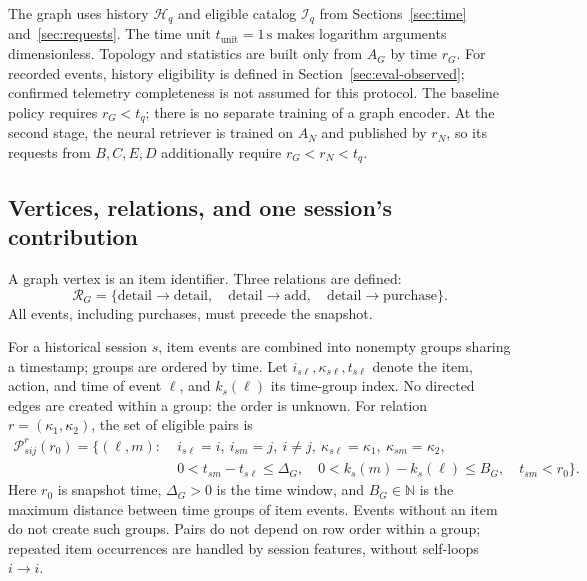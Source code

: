 \documentclass[12pt,a4paper]{article}
\newcommand{\N}{\mathbb N}
\theoremstyle{plainru}
\begin{document}
The graph uses history \(\mathcal H_q\) and eligible catalog
\(\mathcal I_q\) from Sections~\ref{sec:time} and~\ref{sec:requests}.
The time unit \(t_{\mathrm{unit}}=1\,\mathrm{s}\) makes logarithm arguments
dimensionless.
Topology and statistics are built only from $A_G$ by time $r_G$.
For recorded events, history eligibility is defined
in Section~\ref{sec:eval-observed}; confirmed telemetry completeness
is not assumed for this protocol.
The baseline policy requires \(r_G<t_q\); there is no separate training
of a graph encoder. At the second stage, the neural retriever
is trained on \(A_N\) and published by \(r_N\), so its requests
from \(B,C,E,D\) additionally require \(r_G<r_N<t_q\).

\subsection{Vertices, relations, and one session's contribution}

A graph vertex is an item identifier. Three relations are defined:
\begin{equation}\label{eq:model-relations}
\mathcal R_G=
\{\mathrm{detail}\!\to\!\mathrm{detail},\quad
  \mathrm{detail}\!\to\!\mathrm{add},\quad
  \mathrm{detail}\!\to\!\mathrm{purchase}\}.
\end{equation}
All events, including purchases, must precede the snapshot.

For a historical session $s$, item events are combined into nonempty
groups sharing a timestamp; groups are ordered by time.
Let $i_{s\ell},\kappa_{s\ell},t_{s\ell}$ denote the item, action,
and time of event $\ell$, and $k_s(\ell)$ its time-group index.
No directed edges are created within a group: the order is unknown.
For relation $r=(\kappa_1,\kappa_2)$, the set of eligible pairs is
\begin{align}\label{eq:model-event-pairs}
\mathcal P^r_{sij}(r_0)=\{(\ell,m):\;&i_{s\ell}=i,
\ i_{sm}=j,\ i\ne j,\ \kappa_{s\ell}=\kappa_1,\ \kappa_{sm}=\kappa_2,\nonumber\\
&0<t_{sm}-t_{s\ell}\le\Delta_G,\quad
0<k_s(m)-k_s(\ell)\le B_G,\quad t_{sm}<r_0\}.
\end{align}
Here $r_0$ is snapshot time, $\Delta_G>0$ is the time window,
and $B_G\in\N$ is the maximum distance between time groups
of item events. Events without an item do not create such groups.
Pairs do not depend on row order within a group; repeated item occurrences
are handled by session features, without self-loops $i\to i$.
\end{document}
